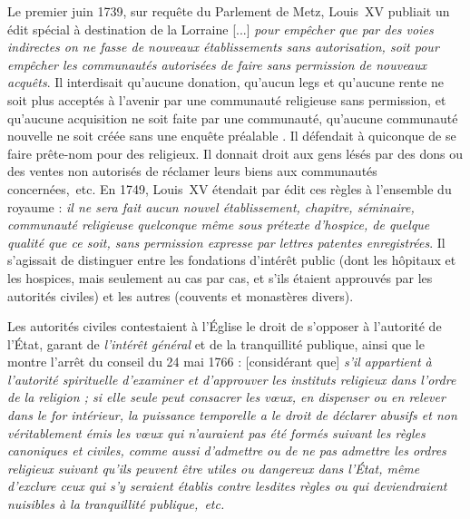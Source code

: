 Le premier juin 1739, sur requête du Parlement de Metz, Louis~XV publiait un édit spécial à destination de la Lorraine {[...] \emph{pour empêcher que par des voies indirectes on ne fasse de nouveaux établissements sans autorisation, soit pour empêcher les communautés autorisées de faire sans permission de nouveaux acquêts}}. Il interdisait qu'aucune donation, qu'aucun legs et qu'aucune rente ne soit plus acceptés à l'avenir par une communauté religieuse sans permission, et qu'aucune acquisition ne soit faite par une communauté, qu'aucune communauté nouvelle ne soit créée sans une enquête préalable . Il défendait à quiconque de se faire prête-nom pour des religieux. Il donnait droit aux gens lésés par des dons ou des ventes non autorisés de réclamer leurs biens aux communautés concernées,~etc. En 1749, Louis~XV étendait par édit ces règles à l'ensemble du royaume : \emph{il ne sera fait aucun nouvel établissement, chapitre, séminaire, communauté religieuse quelconque même sous prétexte d'hospice, de quelque qualité que ce soit, sans permission expresse par lettres patentes enregistrées}. Il s'agissait de distinguer entre les fondations d'intérêt public (dont les hôpitaux et les hospices, mais seulement au cas par cas, et s'ils étaient approuvés par les autorités civiles) et les autres (couvents et monastères divers). 

 Les autorités civiles contestaient à l'Église le droit de s'opposer à l'autorité de l'État, garant de \emph{l'intérêt général} et de la tranquillité publique, ainsi que le montre l'arrêt du conseil du 24 mai 1766 : [considérant que] \emph{s'il appartient à l'autorité spirituelle d'examiner et d'approuver les instituts religieux dans l'ordre de la religion ; si elle seule peut consacrer les vœux, en dispenser ou en relever dans le for intérieur, la puissance temporelle a le droit de déclarer abusifs et non véritablement émis les vœux qui n'auraient pas été formés suivant les règles canoniques et civiles, comme aussi d'admettre ou de ne pas admettre les ordres religieux suivant qu'ils peuvent être utiles ou dangereux dans l'État, même d'exclure ceux qui s'y seraient établis contre lesdites règles ou qui deviendraient nuisibles à la tranquillité publique,~etc.}
 
